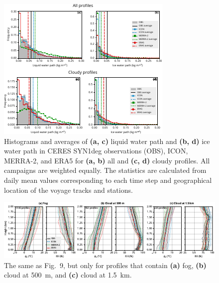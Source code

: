 \documentclass[draft,jgrga]{agutexSI2019}
\begin{document}
\begin{figure}[p!]
\includegraphics[width=\textwidth]{img/stats_hist_si.pdf}
\caption{
Histograms and averages of \textbf{(a, c)} liquid water path and \textbf{(b, d)} ice water path in CERES SYN1deg observations (OBS), ICON, MERRA-2, and ERA5 for \textbf{(a, b)} all and \textbf{(c, d)} cloudy profiles. All campaigns are weighted equally. The statistics are calculated from daily mean values corresponding to each time step and geographical location of the voyage tracks and stations.
}
\label{fig:stats-hist-si}
\end{figure}

\begin{figure}[t]
\centerline{
\includegraphics[width=1.2\textwidth]{img/rs_thetav_hur_cloud.pdf}
}
\caption{
The same as Fig.~9, but only for profiles that contain \textbf{(a)} fog, \textbf{(b)} cloud at 500~m, and \textbf{(c)} cloud at 1.5~km.
}
\label{fig:rs-thetav-hur-cloud}
\end{figure}
\end{document}

